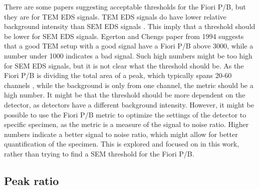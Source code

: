 There are some papers suggesting acceptable thresholds for the Fiori P/B, but they are for TEM EDS signals.
TEM EDS signals do have lower relative background intensity than SEM EDS signals .
This imply that a threshold should be lower for SEM EDS signals.
Egerton and Chengs paper from 1994 \cite{egerton_eds_1994} suggests that a good TEM setup with a good signal have a Fiori P/B above 3000, while a number under 1000 indicates a bad signal.
Such high numbers might be too high for SEM EDS signals, but it is not clear what the threshold should be.
As the Fiori P/B is dividing the total area of a peak, which typically spans 20-60 channels , while the background is only from one channel, the metric should be a high number.
It might be that the threshold should be more dependent on the detector, as detectors have a different background intensity.
However, it might be possible to use the Fiori P/B metric to optimize the settings of the detector to specific specimen, as the metric is a measure of the signal to noise ratio.
Higher numbers indicate a better signal to noise ratio, which might allow for better quantification of the specimen.
This is explored and focused on in this work, rather than trying to find a SEM threshold for the Fiori P/B.





\subsection{Peak ratio}
\label{theory:qc:peakratio}

